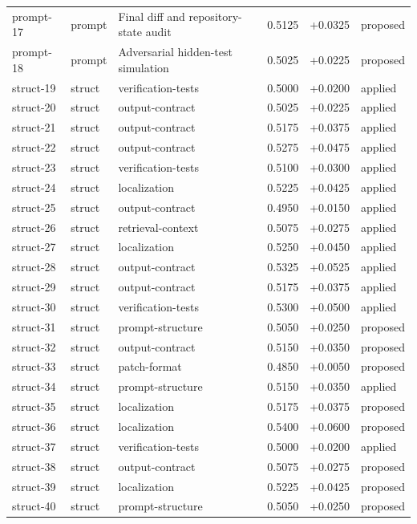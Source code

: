 \begin{center}
\begin{longtable}{llp{5.2cm}rrl}
prompt-17 & prompt & Final diff and repository-state audit & 0.5125 & +0.0325 & proposed \\
prompt-18 & prompt & Adversarial hidden-test simulation & 0.5025 & +0.0225 & proposed \\
struct-19 & struct & verification-tests & 0.5000 & +0.0200 & applied \\
struct-20 & struct & output-contract & 0.5025 & +0.0225 & applied \\
struct-21 & struct & output-contract & 0.5175 & +0.0375 & applied \\
struct-22 & struct & output-contract & 0.5275 & +0.0475 & applied \\
struct-23 & struct & verification-tests & 0.5100 & +0.0300 & applied \\
struct-24 & struct & localization & 0.5225 & +0.0425 & applied \\
struct-25 & struct & output-contract & 0.4950 & +0.0150 & applied \\
struct-26 & struct & retrieval-context & 0.5075 & +0.0275 & applied \\
struct-27 & struct & localization & 0.5250 & +0.0450 & applied \\
struct-28 & struct & output-contract & 0.5325 & +0.0525 & applied \\
struct-29 & struct & output-contract & 0.5175 & +0.0375 & applied \\
struct-30 & struct & verification-tests & 0.5300 & +0.0500 & applied \\
struct-31 & struct & prompt-structure & 0.5050 & +0.0250 & proposed \\
struct-32 & struct & output-contract & 0.5150 & +0.0350 & proposed \\
struct-33 & struct & patch-format & 0.4850 & +0.0050 & proposed \\
struct-34 & struct & prompt-structure & 0.5150 & +0.0350 & applied \\
struct-35 & struct & localization & 0.5175 & +0.0375 & proposed \\
struct-36 & struct & localization & 0.5400 & +0.0600 & proposed \\
struct-37 & struct & verification-tests & 0.5000 & +0.0200 & applied \\
struct-38 & struct & output-contract & 0.5075 & +0.0275 & proposed \\
struct-39 & struct & localization & 0.5225 & +0.0425 & proposed \\
struct-40 & struct & prompt-structure & 0.5050 & +0.0250 & proposed \\

\end{longtable}
\end{center}
